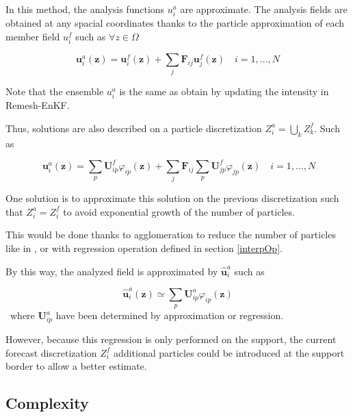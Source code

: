 In this method, the analysis functions $u^a_i$ are approximate. The analysis fields are obtained at any spacial coordinates thanks to the particle approximation of each member field $u^f_i$ such as $\forall z \in \Omega$

\begin{equation*}
  \bm u^a_i(\bm z) = \bm u^f_i(\bm z) + \sum_{j} \bm F_{ij} \bm u^f_j(\bm z) \quad i = 1,\dots, N
\end{equation*}

Note that the ensemble $u^a_i$ is the same as obtain by updating the intensity in Remesh-EnKF.

Thus, solutions are also described on a particle discretization $Z^a_i = \bigcup_k Z_k^f$. Such as

\begin{equation}~\label{part_enkf_eq}
  \bm u^a_i(\bm z) = \sum_p \bm U^f_{ip} \varphi_{ip}(\bm z) + \sum_{j} \bm F_{ij} \sum_p \bm U^f_{jp} \varphi_{jp}(\bm z) \quad i = 1,\dots, N
\end{equation}

One solution is to approximate this solution on the previous discretization such that $Z^a_i = Z_i^f$ to avoid exponential growth of the number of particles.

This would be done thanks to agglomeration to reduce the number of particles like in \cite{yue_continuum_2015}, or with regression operation defined in section \ref{interpOp}.

By this way, the analyzed field is approximated by $\hat{\bm u}^a_i$ such as

\begin{equation*}
  \hat{\bm u}^a_i(\bm z) \simeq \sum_p \bm U^a_{ip} \varphi_{ip}(\bm z)
\end{equation*}~where $\bm U^a_{ip}$ have been determined by approximation or regression.


However, because this regression is only performed on the support, the current forecast discretization $Z^f_i$ additional particles could be introduced at the support border to allow a better estimate.



\subsection{Complexity}


